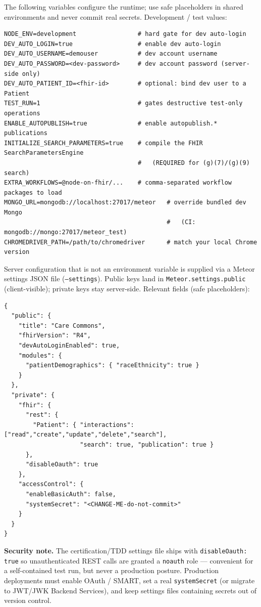 The following variables configure the runtime; use safe placeholders in shared
environments and never commit real secrets. Development / test values:

\begin{lstlisting}
NODE_ENV=development                 # hard gate for dev auto-login
DEV_AUTO_LOGIN=true                  # enable dev auto-login
DEV_AUTO_USERNAME=demouser           # dev account username
DEV_AUTO_PASSWORD=<dev-password>     # dev account password (server-side only)
DEV_AUTO_PATIENT_ID=<fhir-id>        # optional: bind dev user to a Patient
TEST_RUN=1                           # gates destructive test-only operations
ENABLE_AUTOPUBLISH=true              # enable autopublish.* publications
INITIALIZE_SEARCH_PARAMETERS=true    # compile the FHIR SearchParametersEngine
                                     #   (REQUIRED for (g)(7)/(g)(9) search)
EXTRA_WORKFLOWS=@node-on-fhir/...    # comma-separated workflow packages to load
MONGO_URL=mongodb://localhost:27017/meteor   # override bundled dev Mongo
                                             #   (CI: mongodb://mongo:27017/meteor_test)
CHROMEDRIVER_PATH=/path/to/chromedriver      # match your local Chrome version
\end{lstlisting}

Server configuration that is not an environment variable is supplied via a
Meteor settings JSON file (\texttt{--settings}). Public keys land in
\texttt{Meteor.settings.public} (client-visible); private keys stay server-side.
Relevant fields (safe placeholders):

\begin{lstlisting}
{
  "public": {
    "title": "Care Commons",
    "fhirVersion": "R4",
    "devAutoLoginEnabled": true,
    "modules": {
      "patientDemographics": { "raceEthnicity": true }
    }
  },
  "private": {
    "fhir": {
      "rest": {
        "Patient": { "interactions": ["read","create","update","delete","search"],
                     "search": true, "publication": true }
      },
      "disableOauth": true
    },
    "accessControl": {
      "enableBasicAuth": false,
      "systemSecret": "<CHANGE-ME-do-not-commit>"
    }
  }
}
\end{lstlisting}

\textbf{Security note.} The certification/TDD settings file ships with
\texttt{disableOauth: true} so unauthenticated REST calls are granted a
\texttt{noauth} role --- convenient for a self-contained test run, but never a
production posture. Production deployments must enable OAuth / SMART, set a real
\texttt{systemSecret} (or migrate to JWT/JWK Backend Services), and keep
settings files containing secrets out of version control.

